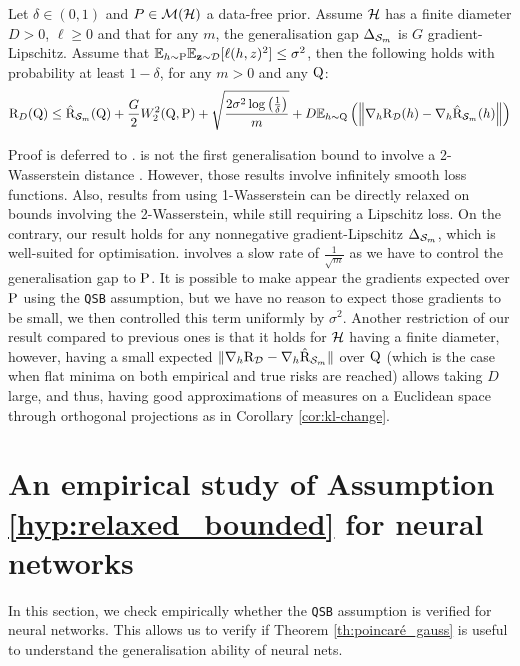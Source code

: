 \begin{theorem}
\label{th:wpb-grad}
Let $\delta\in(0,1)$ and $P\in\Mcal(\Hcal)$ a data-free prior.
Assume $\Hcal$ has a finite diameter $D>0$, $\ell\geq 0$ and that for any $m$, the generalisation gap $\Delta_{\S_m}$ is $G$ gradient-Lipschitz.
Assume that $\mathbb{E}_{h\sim\P}\Ebb_{\z\sim\D}[\ell(h,z)^2] \leq \sigma^2$, then the following holds with probability at least $1-\delta$, for any $m>0$ and any $\Q$:
\begin{align*}
    \Risk_D(\Q) \leq \hat{\Risk}_{\S_m}(\Q) + \frac{G}{2} W_2^2(\Q,\P) + \sqrt{\frac{2\sigma^2\log\LP \frac{1}{\delta} \RP}{m}} + D \mathbb{E}_{h\sim \Q}\LP \left\| \nabla_h \Risk_\D(h) - \nabla_h \hat{\Risk}_{\S_m}(h) \right\| \RP
\end{align*}
\end{theorem}
Proof is deferred to .  
 is not the first generalisation bound to involve a 2-Wasserstein distance \citep{lugosi2022generalization,lugosi2023onlinetopac}.
However, those results involve infinitely smooth loss functions.
Also, results from \citet{amit2022integral,haddouche2023wasserstein,viallard2023learning} using 1-Wasserstein can be directly relaxed on bounds involving the 2-Wasserstein, while still requiring a Lipschitz loss.
On the contrary, our result holds for any nonnegative gradient-Lipschitz $\Delta_{\S_m}$, which is well-suited for optimisation.
 involves a slow rate of $\frac{1}{\sqrt{m}}$ as we have to control the generalisation gap \wrt to $\P$.
It is possible to make appear the gradients expected over $\P$ using the \texttt{QSB} assumption, but we have no reason to expect those gradients to be small, we then controlled this term uniformly by $\sigma^2$.
Another restriction of our result compared to previous ones is that it holds for $\H$ having a finite diameter, however, having a small expected $\| \nabla_h \Risk_\D-\nabla_h\hat{\Risk}_{\S_m}\|$ over $\Q$ (which is the case when flat minima on both empirical and true risks are reached) allows taking $D$ large, and thus, having good approximations of measures on a Euclidean space through orthogonal projections as in Corollary \ref{cor:kl-change}.

\section{An empirical study of Assumption \ref{hyp:relaxed_bounded} for neural networks}
\label{sec: expes}
In this section, we check empirically whether the \texttt{QSB} assumption is verified for neural networks.
This allows us to verify if Theorem \ref{th:poincaré_gauss} is useful to understand the generalisation ability of neural nets.\\

